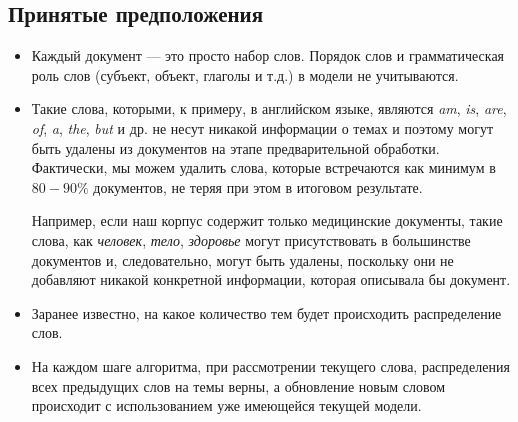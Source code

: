 \subsection{Принятые предположения}

\begin{itemize}
\item Каждый документ --- это просто набор слов. Порядок слов и грамматическая роль слов (субъект, объект, глаголы и т.д.) в модели не учитываются.

\item Такие слова, которыми, к примеру, в английском языке, являются \textit{am}, \textit{is}, \textit{are},  \textit{of}, \textit{a}, \textit{the}, \textit{but} и др. не несут никакой информации о темах и поэтому могут быть удалены из документов на этапе предварительной обработки. Фактически, мы можем удалить слова, которые встречаются как минимум в $80-90 \%$ документов, не теряя при этом в итоговом результате.

Например, если наш корпус содержит только медицинские документы, такие слова, как \textit{человек}, \textit{тело}, \textit{здоровье} могут присутствовать в большинстве документов и, следовательно, могут быть удалены, поскольку они не добавляют никакой конкретной информации, которая описывала бы документ.

\item Заранее известно, на какое количество тем будет происходить распределение слов.

\item На каждом шаге алгоритма, при рассмотрении текущего слова, распределения всех предыдущих слов на темы верны, а обновление новым словом происходит с использованием уже имеющейся текущей модели.

\end{itemize}